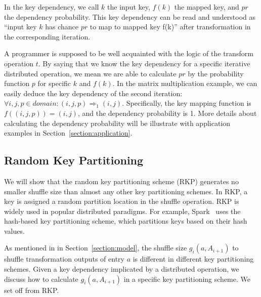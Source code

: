 \documentclass[10pt,journal,compsoc]{IEEEtran}
\begin{document}
In the key dependency, we call $k$ the input key, $f(k)$ the mapped key, 
and $pr$ the dependency probability.
This key dependency can be read and understood as 
``input key $k$ has chance $pr$ to map to mapped key f(k)'' after
transformation in the corresponding iteration.

A programmer is supposed to be well acquainted with the logic of the transform operation $t$. 
By saying that we know the key dependency for a specific iterative distributed operation,
we mean we are able to calculate $pr$ by the probability function 
$p$ for specific $k$ and $f(k)$.
In the matrix multiplication example, we can easily deduce
the key dependency of the second iteration: 
$\forall i, j, p \in domain: (i, j, p) \Rightarrow_{1} (i, j)$.  
Specifically, the key mapping function is $f((i, j, p)) = (i, j)$, 
and the dependency probability is 1. 
More details about calculating the dependency probability will be 
illustrate with application examples in Section~\ref{section:application}.



\subsection{Random Key Partitioning}\label{section:rkp}
We will show that the random key partitioning scheme (RKP) generates no
smaller shuffle size than almost any other key partitioning schemes. 
In RKP, a key is assigned a random partition location in the shuffle operation. 
RKP is widely used in popular distributed paradigms.
For example, Spark~\cite{zaharia2012resilient} uses the hash-based key partitioning scheme, which partitions keys based on their hash values. 

As mentioned in in Section~\ref{section:model}, the shuffle size $g_i(a, A_{i+1})$ to shuffle transformation outputs of entry $a$ is different in different key partitioning schemes. 
Given a key dependency implicated by a distributed operation, we discuss how to calculate $g_i(a, A_{i+1})$ in a specific key partitioning scheme. 
We set off from RKP.
\end{document}
